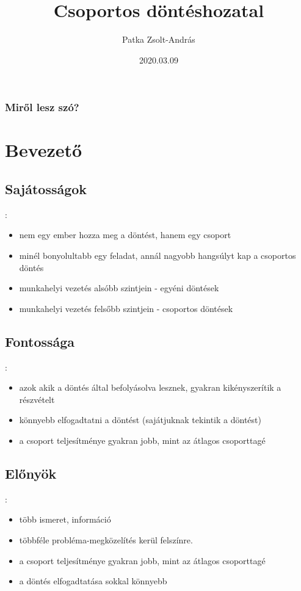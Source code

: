 \documentclass{beamer}
\title{Csoportos döntéshozatal}
\author{Patka Zsolt-András}
\institute{Sapientia EMTE}
\date{2020.03.09}
\begin{document}
\begin{frame}
    \titlepage
\end{frame}

\begin{frame}
\frametitle{Miről lesz szó?}
\tableofcontents
\end{frame}

\section{Bevezető}

\subsection{Sajátosságok}
\begin{frame}{\secname : \subsecname}
    \begin{itemize}
        \item nem egy ember hozza meg a döntést, hanem egy csoport
        \item minél bonyolultabb egy feladat, annál nagyobb hangsúlyt kap a csoportos döntés
        \item munkahelyi vezetés alsóbb szintjein - egyéni döntések
        \item munkahelyi vezetés felsőbb szintjein - csoportos döntések
    \end{itemize}
\end{frame}

\subsection{Fontossága}
\begin{frame}{\secname : \subsecname}
    \begin{itemize}
        \item azok akik a döntés által befolyásolva lesznek, gyakran kikényszerítik a részvételt
        \item könnyebb elfogadtatni a döntést (sajátjuknak tekintik a döntést)
        \item a csoport teljesítménye gyakran jobb, mint az átlagos csoporttagé
    \end{itemize}
\end{frame}


\subsection{Előnyök}
\begin{frame}{\secname : \subsecname}
    \begin{itemize}
        \item több ismeret, információ
        \item többféle probléma-megközelítés kerül felszínre.
        \item a csoport teljesítménye gyakran jobb, mint az átlagos csoporttagé
        \item a döntés elfogadtatása sokkal könnyebb
    \end{itemize}
\end{frame}
\end{document}
